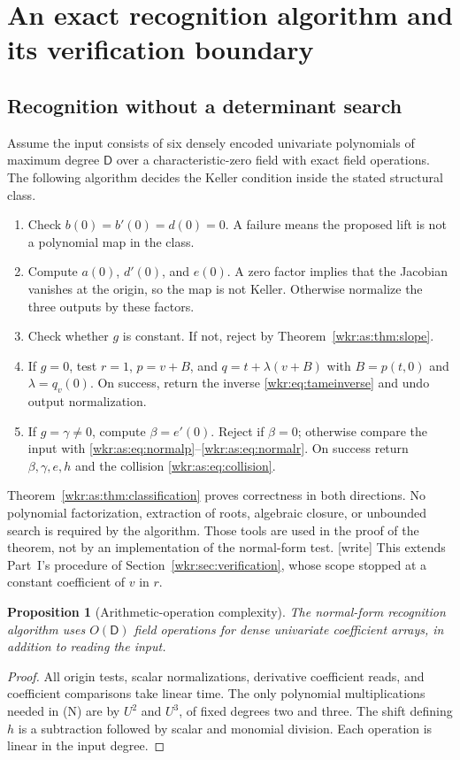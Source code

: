 \documentclass[11pt,a4paper]{article}
\numberwithin{equation}{section}
\newtheorem{proposition}[theorem]{Proposition}
\theoremstyle{definition}
\theoremstyle{remark}
\newcommand{\Dcap}{\mathsf D}
\begin{document}
\section{An exact recognition algorithm and its verification boundary}
\label{wkr:as:sec:algorithm}

\subsection{Recognition without a determinant search}

Assume the input consists of six densely encoded univariate polynomials
of maximum degree $\Dcap$ over a characteristic-zero field with exact
field operations. The following algorithm decides the Keller condition
inside the stated structural class.

\begin{enumerate}[label=\arabic*.]
\item Check $b(0)=b'(0)=d(0)=0$. A failure means the proposed lift is not
a polynomial map in the class.
\item Compute $a(0)$, $d'(0)$, and $e(0)$. A zero factor implies that the
Jacobian vanishes at the origin, so the map is not Keller. Otherwise
normalize the three outputs by these factors.
\item Check whether $g$ is constant. If not, reject by
Theorem~\ref{wkr:as:thm:slope}.
\item If $g=0$, test $r=1$, $p=v+B$, and $q=t+\lambda(v+B)$ with
$B=p(t,0)$ and $\lambda=q_v(0)$. On success, return the inverse
\eqref{wkr:eq:tameinverse} and undo output normalization.
\item If $g=\gamma\ne0$, compute $\beta=e'(0)$. Reject if $\beta=0$;
otherwise compare the input with
\eqref{wkr:as:eq:normalp}--\eqref{wkr:as:eq:normalr}. On success return
$\beta,\gamma,e,h$ and the collision \eqref{wkr:as:eq:collision}.
\end{enumerate}

Theorem~\ref{wkr:as:thm:classification} proves correctness in both
directions. No polynomial factorization, extraction of roots, algebraic
closure, or unbounded search is required by the algorithm. Those tools
are used in the proof of the theorem, not by an implementation of the
normal-form test.
\textup{[write]} This extends Part~I's procedure of
Section~\ref{wkr:sec:verification}, whose scope stopped at a constant
coefficient of $v$ in $r$.

\begin{proposition}[Arithmetic-operation complexity]
\label{wkr:as:prop:complexity}
The normal-form recognition algorithm uses $O(\Dcap)$ field operations
for dense univariate coefficient arrays, in addition to reading the
input.
\end{proposition}
\begin{proof}
All origin tests, scalar normalizations, derivative coefficient reads,
and coefficient comparisons take linear time. The only polynomial
multiplications needed in (N) are by $U^2$ and $U^3$, of fixed degrees
two and three. The shift defining $h$ is a subtraction followed by scalar
and monomial division. Each operation is linear in the input degree.
\end{proof}
\end{document}
